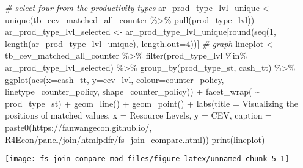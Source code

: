 \documentclass[
]{article}
\newenvironment{Shaded}{\begin{snugshade}}{\end{snugshade}}
\newcommand{\AttributeTok}[1]{\textcolor[rgb]{0.77,0.63,0.00}{#1}}
\newcommand{\CommentTok}[1]{\textcolor[rgb]{0.56,0.35,0.01}{\textit{#1}}}
\newcommand{\DecValTok}[1]{\textcolor[rgb]{0.00,0.00,0.81}{#1}}
\newcommand{\FunctionTok}[1]{\textcolor[rgb]{0.00,0.00,0.00}{#1}}
\newcommand{\NormalTok}[1]{#1}
\newcommand{\OtherTok}[1]{\textcolor[rgb]{0.56,0.35,0.01}{#1}}
\newcommand{\SpecialCharTok}[1]{\textcolor[rgb]{0.00,0.00,0.00}{#1}}
\newcommand{\StringTok}[1]{\textcolor[rgb]{0.31,0.60,0.02}{#1}}
\begin{document}
\begin{Shaded}
\begin{Highlighting}[]
\CommentTok{\# select four from the productivity types}
\NormalTok{ar\_prod\_type\_lvl\_unique }\OtherTok{\textless{}{-}} \FunctionTok{unique}\NormalTok{(tb\_cev\_matched\_all\_counter }\SpecialCharTok{\%\textgreater{}\%} \FunctionTok{pull}\NormalTok{(prod\_type\_lvl))}
\NormalTok{ar\_prod\_type\_lvl\_selected }\OtherTok{\textless{}{-}}\NormalTok{ ar\_prod\_type\_lvl\_unique[}\FunctionTok{round}\NormalTok{(}\FunctionTok{seq}\NormalTok{(}\DecValTok{1}\NormalTok{, }\FunctionTok{length}\NormalTok{(ar\_prod\_type\_lvl\_unique), }\AttributeTok{length.out=}\DecValTok{4}\NormalTok{))]}
\CommentTok{\# graph}
\NormalTok{lineplot }\OtherTok{\textless{}{-}}\NormalTok{ tb\_cev\_matched\_all\_counter }\SpecialCharTok{\%\textgreater{}\%}
    \FunctionTok{filter}\NormalTok{(prod\_type\_lvl }\SpecialCharTok{\%in\%}\NormalTok{ ar\_prod\_type\_lvl\_selected) }\SpecialCharTok{\%\textgreater{}\%}
    \FunctionTok{group\_by}\NormalTok{(prod\_type\_st, cash\_tt) }\SpecialCharTok{\%\textgreater{}\%}
    \FunctionTok{ggplot}\NormalTok{(}\FunctionTok{aes}\NormalTok{(}\AttributeTok{x=}\NormalTok{cash\_tt, }\AttributeTok{y=}\NormalTok{cev\_lvl,}
               \AttributeTok{colour=}\NormalTok{counter\_policy, }\AttributeTok{linetype=}\NormalTok{counter\_policy, }\AttributeTok{shape=}\NormalTok{counter\_policy)) }\SpecialCharTok{+}
        \FunctionTok{facet\_wrap}\NormalTok{( }\SpecialCharTok{\textasciitilde{}}\NormalTok{ prod\_type\_st) }\SpecialCharTok{+}
        \FunctionTok{geom\_line}\NormalTok{() }\SpecialCharTok{+}
        \FunctionTok{geom\_point}\NormalTok{() }\SpecialCharTok{+}
        \FunctionTok{labs}\NormalTok{(}\AttributeTok{title =} \StringTok{\textquotesingle{}Visualizing the positions of matched values\textquotesingle{}}\NormalTok{,}
             \AttributeTok{x =} \StringTok{\textquotesingle{}Resource Levels\textquotesingle{}}\NormalTok{,}
             \AttributeTok{y =} \StringTok{\textquotesingle{}CEV\textquotesingle{}}\NormalTok{,}
             \AttributeTok{caption =} \FunctionTok{paste0}\NormalTok{(}\StringTok{\textquotesingle{}https://fanwangecon.github.io/\textquotesingle{}}\NormalTok{,}
                              \StringTok{\textquotesingle{}R4Econ/panel/join/htmlpdfr/fs\_join\_compare.html\textquotesingle{}}\NormalTok{)) }
\FunctionTok{print}\NormalTok{(lineplot)}
\end{Highlighting}
\end{Shaded}

\begin{center}\texttt{[image: fs\_join\_compare\_mod\_files/figure-latex/unnamed-chunk-5-1]} \end{center}
\end{document}
